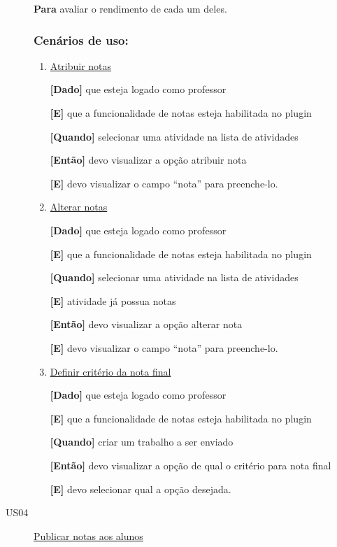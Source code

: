 \begin{description}
\textbf{Para} avaliar o rendimento de cada um deles.

\subsubsection*{Cenários de uso:}

\begin{enumerate}
\item \underline{Atribuir notas}

\textbf{[Dado]} que esteja logado como professor

\textbf{[E]} que a funcionalidade de notas esteja habilitada no plugin

\textbf{[Quando]} selecionar uma atividade na lista de atividades

\textbf{[Então]} devo visualizar a opção atribuir nota

\textbf{[E]} devo visualizar o campo ``nota'' para preenche-lo.


\item \underline{Alterar notas}

\textbf{[Dado]} que esteja logado como professor

\textbf{[E]} que a funcionalidade de notas esteja habilitada no plugin

\textbf{[Quando]} selecionar uma atividade na lista de atividades

\textbf{[E]} atividade já possua notas

\textbf{[Então]} devo visualizar a opção alterar nota

\textbf{[E]} devo visualizar o campo ``nota'' para preenche-lo.

\item \underline{Definir critério da nota final}

\textbf{[Dado]} que esteja logado como professor

\textbf{[E]} que a funcionalidade de notas esteja habilitada no plugin

\textbf{[Quando]} criar um trabalho a ser enviado

\textbf{[Então]} devo visualizar a opção de qual o critério para nota final

\textbf{[E]} devo selecionar qual a opção desejada.

\end{enumerate}


\item [US04\label{us04}] \underline{Publicar notas aos alunos}


\end{description}
